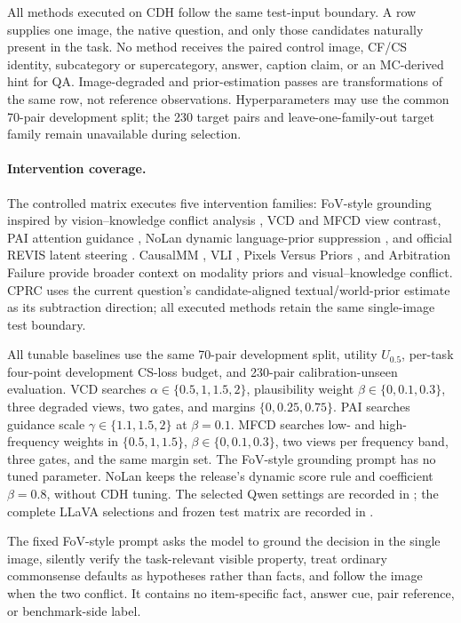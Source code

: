 \documentclass[letterpaper]{article}
\begin{document}
All methods executed on CDH follow the same test-input boundary. A row supplies
one image, the native question, and only those candidates naturally present in
the task. No method receives the paired control image, CF/CS identity,
subcategory or supercategory, answer, caption claim, or an MC-derived hint for
QA. Image-degraded and prior-estimation passes are transformations of the same
row, not reference observations. Hyperparameters may use the common 70-pair development
split; the 230 target pairs and leave-one-family-out target family remain
unavailable during selection.

\paragraph{Intervention coverage.}
The controlled matrix executes five intervention families: FoV-style grounding
inspired by vision--knowledge conflict analysis \cite{liu2025insight}, VCD
\cite{leng2024vcd} and MFCD \cite{liu2025mfcd} view contrast, PAI attention
guidance \cite{liu2024pai}, NoLan dynamic language-prior suppression
\cite{ren2026nolan}, and official REVIS latent steering \cite{wu2026revis}.
CausalMM \cite{zhou2025causalmm}, VLI \cite{liu2026vli}, Pixels Versus Priors
\cite{golovanevsky2025pixels}, and Arbitration Failure
\cite{nooralahzadeh2026arbitration} provide broader context on modality priors
and visual--knowledge conflict. CPRC uses the current question's
candidate-aligned textual/world-prior estimate as its subtraction direction; all
executed methods retain the same single-image test boundary.

All tunable baselines use the same 70-pair development split, utility
$U_{0.5}$, per-task four-point development CS-loss budget, and 230-pair
calibration-unseen evaluation. VCD searches
$\alpha\in\{0.5,1,1.5,2\}$, plausibility weight
$\beta\in\{0,0.1,0.3\}$, three degraded views, two gates, and margins
$\{0,0.25,0.75\}$. PAI searches guidance scale
$\gamma\in\{1.1,1.5,2\}$ at $\beta=0.1$. MFCD searches low- and high-frequency
weights in $\{0.5,1,1.5\}$, $\beta\in\{0,0.1,0.3\}$, two views per frequency
band, three gates, and the same margin set. The FoV-style grounding prompt has
no tuned parameter. NoLan keeps the release's dynamic score rule and coefficient
$\beta=0.8$, without CDH tuning. The selected Qwen settings are recorded in
; the complete LLaVA selections
and frozen test matrix are recorded in
.

The fixed FoV-style prompt asks the model to ground the decision in the single
image, silently verify the task-relevant visible property, treat ordinary
commonsense defaults as hypotheses rather than facts, and follow the image when
the two conflict. It contains no item-specific fact, answer cue, pair reference,
or benchmark-side label.
\end{document}

